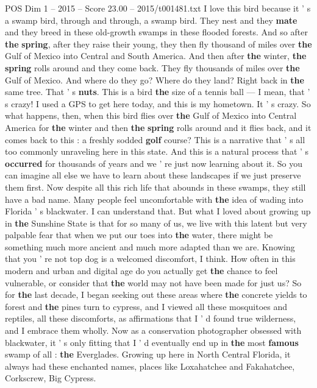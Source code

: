 \begin{textsample}{POS Dim 1 – 2015 – Score 23.00 – 2015/t001481.txt}
I love this bird because it ' s a swamp bird, through and through, a swamp bird.
They nest and they \textbf{mate} and they breed in these old-growth swamps in these flooded forests.
And so after \textbf{the} \textbf{spring}, after they raise their young, they then fly thousand of miles over \textbf{the} Gulf of Mexico into Central and South America.
And then after \textbf{the} winter, \textbf{the} \textbf{spring} rolls around and they come back.
They fly thousands of miles over \textbf{the} Gulf of Mexico.
And where do they go?
Where do they land?
Right back in \textbf{the} same tree.
That ' s \textbf{nuts}.
This is a bird \textbf{the} size of a tennis ball — I mean, that ' s crazy!
I used a GPS to get here today, and this is my hometown.
It ' s crazy.
So what happens, then, when this bird flies over \textbf{the} Gulf of Mexico into Central America for \textbf{the} winter and then \textbf{the} \textbf{spring} rolls around and it flies back, and it comes back to this : a freshly sodded \textbf{golf} course?
This is a narrative that ' s all too commonly unraveling here in this state.
And this is a natural process that ' s \textbf{occurred} for thousands of years and we ' re just now learning about it.
So you can imagine all else we have to learn about these landscapes if we just preserve them first.
Now despite all this rich life that abounds in these swamps, they still have a bad name.
Many people feel uncomfortable with \textbf{the} idea of wading into Florida ' s blackwater.
I can understand that.
But what I loved about growing up in \textbf{the} Sunshine State is that for so many of us, we live with this latent but very palpable fear that when we put our toes into \textbf{the} water, there might be something much more ancient and much more adapted than we are.
Knowing that you ' re not top dog is a welcomed discomfort, I think.
How often in this modern and urban and digital age do you actually get \textbf{the} chance to feel vulnerable, or consider that \textbf{the} world may not have been made for just us?
So for \textbf{the} last decade, I began seeking out these areas where \textbf{the} concrete yields to forest and \textbf{the} pines turn to cypress, and I viewed all these mosquitoes and reptiles, all these discomforts, as affirmations that I ' d found true wilderness, and I embrace them wholly.
Now as a conservation photographer obsessed with blackwater, it ' s only fitting that I ' d eventually end up in \textbf{the} most \textbf{famous} swamp of all : \textbf{the} Everglades.
Growing up here in North Central Florida, it always had these enchanted names, places like Loxahatchee and Fakahatchee, Corkscrew, Big Cypress.

\end{textsample}
